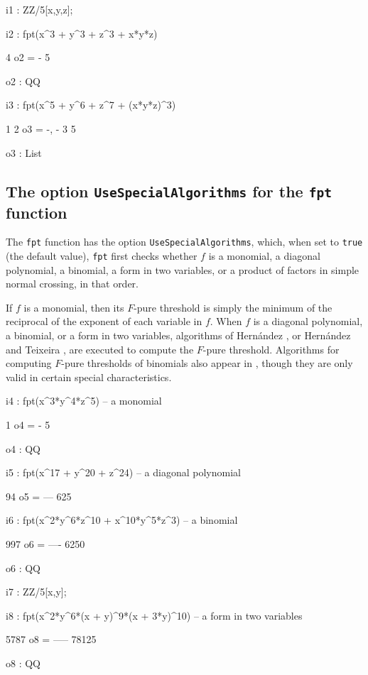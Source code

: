 \documentclass{amsart}
\begin{document}
{\small
{}
\begin{MyVerbatim}

i1 : ZZ/5[x,y,z];

i2 : fpt(x^3 + y^3 + z^3 + x*y*z)

     4
o2 = -
     5

o2 : QQ

i3 : fpt(x^5 + y^6 + z^7 + (x*y*z)^3)

      1  2
o3 = {-, -}
      3  5

o3 : List
\end{MyVerbatim}
}
\medspace

\subsection{The option {\tt UseSpecialAlgorithms} for the {\tt fpt} function}

The {\tt fpt} function has the option {\tt UseSpecialAlgorithms}, which, when
set to {\tt true} (the default value), {\tt fpt} first checks whether $f$ is a monomial, a diagonal polynomial, a binomial, a form in two variables, or a product of factors in simple normal crossing, in that order. 

If $f$ is a monomial, then its $F$-pure threshold is simply the minimum of the reciprocal of the exponent of each variable in $f$.
When $f$ is a diagonal polynomial, a binomial, or a form in two variables, 
algorithms of Hern\'andez \cite{HernandezFInvariantsOfDiagonalHyp, HernandezFPureThresholdOfBinomial}, or Hern\'andez and Teixeira \cite{HernandezTeixeiraFThresholdFunctions},  are executed to compute the $F$-pure threshold.  Algorithms for computing $F$-pure thresholds of binomials also appear in \cite{ShibutaTakagiLCThresholds}, though they are only valid in certain special characteristics.

{\small
{}
\begin{MyVerbatim}

i4 : fpt(x^3*y^4*z^5) -- a monomial

      1
o4 = -
      5

o4 : QQ


i5 : fpt(x^17 + y^20 + z^24) -- a diagonal polynomial

      94
o5 = ---
     625

i6 : fpt(x^2*y^6*z^10 + x^10*y^5*z^3) -- a binomial

      997
o6 = ----
     6250

o6 : QQ

i7 : ZZ/5[x,y];

i8 : fpt(x^2*y^6*(x + y)^9*(x + 3*y)^10) -- a form in two variables

      5787
o8 = -----
     78125

o8 : QQ
\end{MyVerbatim}
}
\medspace
\end{document}
